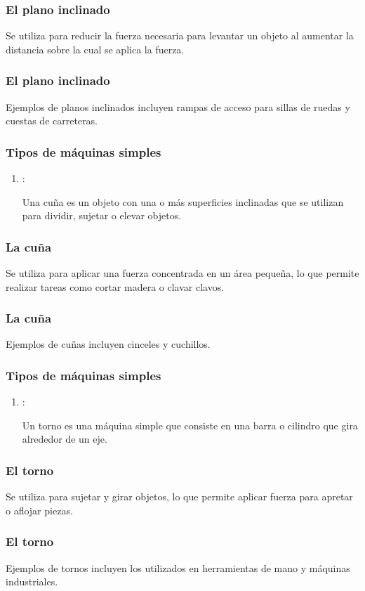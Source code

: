 \documentclass[14pt]{beamer}
\begin{document}
\begin{frame}
\frametitle{El plano inclinado}
Se utiliza para reducir la fuerza necesaria para levantar un objeto al aumentar la distancia sobre la cual se aplica la fuerza.
\end{frame}
\begin{frame}
\frametitle{El plano inclinado}
Ejemplos de planos inclinados incluyen rampas de acceso para sillas de ruedas y cuestas de carreteras.
\end{frame}
\begin{frame}
\frametitle{Tipos de máquinas simples}
\begin{enumerate}[<+->]
\conti
\item {}:

Una cuña es un objeto con una o más superficies inclinadas que se utilizan para dividir, sujetar o elevar objetos.
\conti
\end{enumerate}
\end{frame}
\begin{frame}
\frametitle{La cuña}
Se utiliza para aplicar una fuerza concentrada en un área pequeña, lo que permite realizar tareas como cortar madera o clavar clavos.
\end{frame}
\begin{frame}
\frametitle{La cuña}
Ejemplos de cuñas incluyen cinceles y cuchillos.
\end{frame}
\begin{frame}
\frametitle{Tipos de máquinas simples}
\begin{enumerate}[<+->]
\conti
\item {}:

Un torno es una máquina simple que consiste en una barra o cilindro que gira alrededor de un eje. 
\seti
\end{enumerate}
\end{frame}
\begin{frame}
\frametitle{El torno}
Se utiliza para sujetar y girar objetos, lo que permite aplicar fuerza para apretar o aflojar piezas.
\end{frame}
\begin{frame}
\frametitle{El torno}
Ejemplos de tornos incluyen los utilizados en herramientas de mano y máquinas industriales.
\end{frame}
\end{document}
